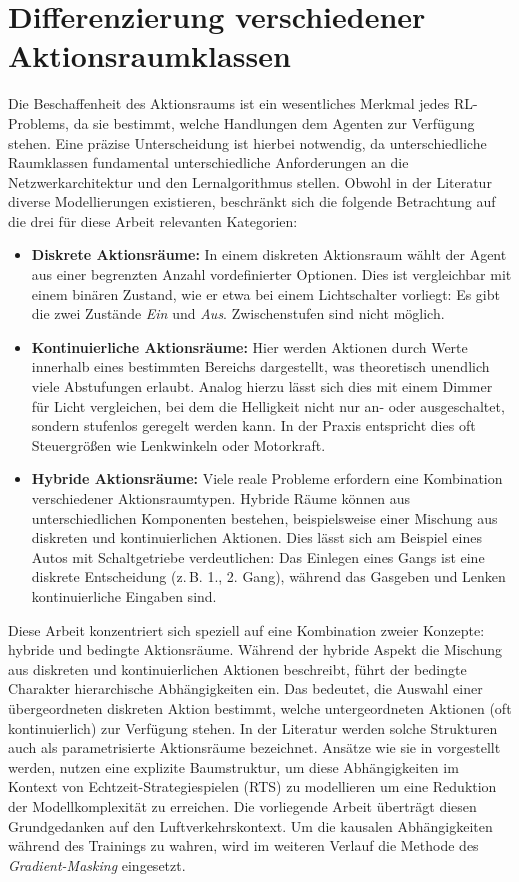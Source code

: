 \section{Differenzierung verschiedener Aktionsraumklassen}
\label{sc:Aktionsraumklassen}
Die Beschaffenheit des Aktionsraums ist ein wesentliches Merkmal jedes \ac{RL}\hyp{}Problems, da sie bestimmt, welche Handlungen dem Agenten zur Verfügung stehen. Eine präzise Unterscheidung ist hierbei notwendig, da unterschiedliche Raumklassen fundamental unterschiedliche Anforderungen an die Netzwerkarchitektur und den Lernalgorithmus stellen.
Obwohl in der Literatur diverse Modellierungen existieren, beschränkt sich die folgende Betrachtung auf die drei für diese Arbeit relevanten Kategorien:
\begin{itemize}
    \item \textbf{Diskrete Aktionsräume:}
    In einem diskreten Aktionsraum wählt der Agent aus einer begrenzten Anzahl vordefinierter Optionen.
    Dies ist vergleichbar mit einem binären Zustand, wie er etwa bei einem Lichtschalter vorliegt: Es gibt die zwei Zustände \textit{Ein} und \textit{Aus}. Zwischenstufen sind nicht möglich.
    \item \textbf{Kontinuierliche Aktionsräume:}
    Hier werden Aktionen durch Werte innerhalb eines bestimmten Bereichs dargestellt, was theoretisch unendlich viele Abstufungen erlaubt.
    Analog hierzu lässt sich dies mit einem Dimmer für Licht vergleichen, bei dem die Helligkeit nicht nur an- oder ausgeschaltet, sondern stufenlos geregelt werden kann. In der Praxis entspricht dies oft Steuergrößen wie Lenkwinkeln oder Motorkraft.
    \item \textbf{Hybride Aktionsräume:}
    Viele reale Probleme erfordern eine Kombination verschiedener Aktionsraumtypen. Hybride Räume können aus unterschiedlichen Komponenten bestehen, beispielsweise einer Mischung aus diskreten und kontinuierlichen Aktionen.
    Dies lässt sich am Beispiel eines Autos mit Schaltgetriebe verdeutlichen: Das Einlegen eines Gangs ist eine diskrete Entscheidung (z.\,B. 1., 2. Gang), während das Gasgeben und Lenken kontinuierliche Eingaben sind.
\end{itemize}

Diese Arbeit konzentriert sich speziell auf eine Kombination zweier Konzepte: hybride und bedingte Aktionsräume. Während der hybride Aspekt die Mischung aus diskreten und kontinuierlichen Aktionen beschreibt, führt der bedingte Charakter hierarchische Abhängigkeiten ein. Das bedeutet, die Auswahl einer übergeordneten diskreten Aktion bestimmt, welche untergeordneten Aktionen (oft kontinuierlich) zur Verfügung stehen. In der Literatur werden solche Strukturen auch als parametrisierte Aktionsräume bezeichnet. Ansätze wie sie in \cite{bamford2021generalising} vorgestellt werden, nutzen eine explizite Baumstruktur, um diese Abhängigkeiten im Kontext von Echtzeit\hyp{}Strategiespielen (RTS) zu modellieren um eine Reduktion der Modellkomplexität zu erreichen. Die vorliegende Arbeit überträgt diesen Grundgedanken auf den Luftverkehrskontext. Um die kausalen Abhängigkeiten während des Trainings zu wahren, wird im weiteren Verlauf die Methode des \textit{Gradient\hyp{}Masking} eingesetzt.

